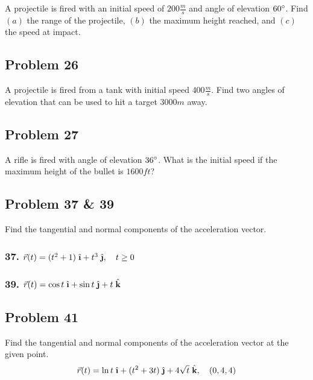 \documentclass{article}
\newcommand{\ihat}{\;\hat{\textbf{\i}}}
\newcommand{\jhat}{\;\hat{\textbf{\j}}}
\newcommand{\khat}{\;\hat{\textbf{k}}}
\newcommand{\rvec}{\vec{r}(t)}
\begin{document}
A projectile is fired with an initial speed of $200\frac m s$ and angle of elevation $60 \degree$. Find $(a)$ the range of the projectile, $(b)$ the maximum height reached, and $(c)$ the speed at impact.

\subsection*{Problem 26}

A projectile is fired from a tank with initial speed $400 \frac m s$. Find two angles of elevation that can be used to hit a target $3000m$ away.

\subsection*{Problem 27}

A rifle is fired with angle of elevation $36\degree$. What is the initial speed if the maximum height of the bullet is $1600 ft$?

\subsection*{Problem 37 \& 39}

Find the tangential and normal components of the acceleration vector.

\subsubsection*{37. $\rvec = (t^2 + 1)\ihat + t^3\jhat, \quad t \geq 0    $}
\subsubsection*{39. $\rvec = \cos t\ihat + \sin t\jhat + t\khat$}
\subsection*{Problem 41}

Find the tangential and normal components of the acceleration vector at the given point.
\[
    \rvec = \ln t\ihat + (t^2 + 3t)\jhat + 4\sqrt t\khat, \quad (0, 4, 4)
\]
\end{document}
